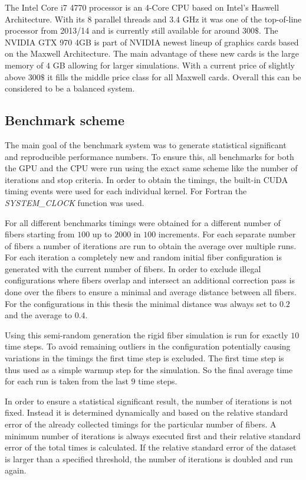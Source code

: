 The Intel Core i7 4770 processor is an 4-Core CPU based on Intel's Haswell Architecture. With its 8 parallel threads and $3.4$ GHz it was one of the top-of-line processor from 2013/14 and is currently still available for around $300\$$. The NVIDIA GTX 970 4GB is part of NVIDIA newest lineup of graphics cards based on the Maxwell Architecture. The main advantage of these new cards is the large memory of $4$ GB allowing for larger simulations. With a current price of slightly above $300\$$ it fills the middle price class for all Maxwell cards. Overall this can be considered to be a balanced system.

\subsection{Benchmark scheme}

The main goal of the benchmark system was to generate statistical significant and reproducible performance numbers. To ensure this, all benchmarks for both the GPU and the CPU were run using the exact same scheme like the number of iterations and stop criteria. In order to obtain the timings, the built-in CUDA timing events were used for each individual kernel. For Fortran the \emph{SYSTEM\_CLOCK} function was used.

For all different benchmarks timings were obtained for a different number of fibers starting from $100$ up to $2000$ in $100$ increments. For each separate number of fibers a number of iterations are run to obtain the average over multiple runs. For each iteration a completely new and random initial fiber configuration is generated with the current number of fibers. In order to exclude illegal configurations where fibers overlap and intersect an additional correction pass is done over the fibers to ensure a minimal and average distance between all fibers. For the configurations in this thesis the minimal distance was always set to $0.2$ and the average to $0.4$.

Using this semi-random generation the rigid fiber simulation is run for exactly $10$ time steps. To avoid remaining outliers in the configuration potentially causing variations in the timings the first time step is excluded. The first time step is thus used as a simple warmup step for the simulation. So the final average time for each run is taken from the last $9$ time steps.

In order to ensure a statistical significant result, the number of iterations is not fixed. Instead it is determined dynamically and based on the relative standard error of the already collected timings for the particular number of fibers. A minimum number of iterations is always executed first and their relative standard error of the total times is calculated. If the relative standard error of the dataset is larger than a specified threshold, the number of iterations is doubled and run again.

